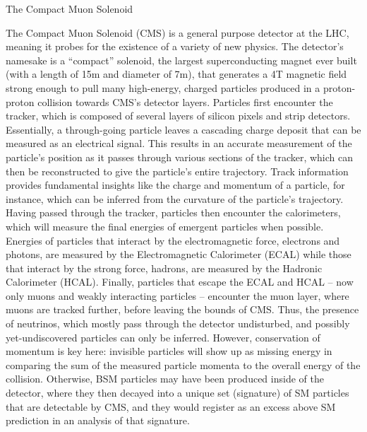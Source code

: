 \begin{section}{The Compact Muon Solenoid}

The Compact Muon Solenoid (CMS) is a general purpose detector at the LHC, meaning it probes for the existence of a variety of new physics. The detector's namesake is a ``compact'' solenoid, the largest superconducting magnet ever built (with a length of 15m and diameter of 7m), that generates a 4T magnetic field strong enough to pull many high-energy, charged particles produced in a proton-proton collision towards CMS's detector layers\cite{CMS:1994hea}. Particles first encounter the tracker, which is composed of several layers of silicon pixels and strip detectors. Essentially, a through-going particle leaves a cascading charge deposit that can be measured as an electrical signal. This results in an accurate measurement of the particle's position as it passes through various sections of the tracker, which can then be reconstructed to give the particle's entire trajectory. Track information provides fundamental insights like the charge and momentum of a particle, for instance, which can be inferred from the curvature of the particle's trajectory. Having passed through the tracker, particles then encounter the calorimeters, which will measure the final energies of emergent particles when possible. Energies of particles that interact by the electromagnetic force, electrons and photons, are measured by the Electromagnetic Calorimeter (ECAL) while those that interact by the strong force, hadrons, are measured by the Hadronic Calorimeter (HCAL). Finally, particles that escape the ECAL and HCAL -- now only muons and weakly interacting particles -- encounter the muon layer, where muons are tracked further, before leaving the bounds of CMS. Thus, the presence of neutrinos, which mostly pass through the detector undisturbed, and possibly yet-undiscovered particles can only be inferred. However, conservation of momentum is key here: invisible particles will show up as missing energy in comparing the sum of the measured particle momenta to the overall energy of the collision. Otherwise, BSM particles may have been produced inside of the detector, where they then decayed into a unique set (signature) of SM particles that are detectable by CMS, and they would register as an excess above SM prediction in an analysis of that signature.


\end{section}
